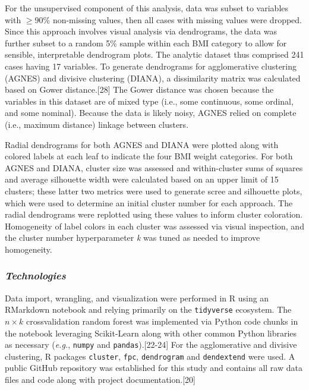 \documentclass[]{article}
\begin{document}
For the unsupervised component of this analysis, data was subset to
variables with \(\ge 90\)\% non-missing values, then all cases with
missing values were dropped. Since this approach involves visual
analysis via dendrograms, the data was further subset to a random 5\%
sample within each BMI category to allow for sensible, interpretable
dendrogram plots. The analytic dataset thus comprised 241 cases having
17 variables. To generate dendrograms for agglomerative clustering
(AGNES) and divisive clustering (DIANA), a dissimilarity matrix was
calculated based on Gower distance.{[}28{]} The Gower distance was
chosen because the variables in this dataset are of mixed type (i.e.,
some continuous, some ordinal, and some nominal). Because the data is
likely noisy, AGNES relied on complete (i.e., maximum distance) linkage
between clusters.

Radial dendrograms for both AGNES and DIANA were plotted along with
colored labels at each leaf to indicate the four BMI weight categories.
For both AGNES and DIANA, cluster size was assessed and within-cluster
sums of squares and average silhouette width were calculated based on an
upper limit of 15 clusters; these latter two metrics were used to
generate scree and silhouette plots, which were used to determine an
initial cluster number for each approach. The radial dendrograms were
replotted using these values to inform cluster coloration. Homogeneity
of label colors in each cluster was assessed via visual inspection, and
the cluster number hyperparameter \emph{k} was tuned as needed to
improve homogeneity.

\hypertarget{technologies}{%
\subsubsection{\texorpdfstring{\emph{Technologies}}{Technologies}}\label{technologies}}

Data import, wrangling, and visualization were performed in R using an
RMarkdown notebook and relying primarily on the \texttt{tidyverse}
ecosystem. The \(n \times k\) crossvalidation random forest was
implemented via Python code chunks in the notebook leveraging
Scikit-Learn along with other common Python libraries as necessary
(\emph{e.g.}, \texttt{numpy} and \texttt{pandas}).{[}22-24{]} For the
agglomerative and divisive clustering, R packages \texttt{cluster},
\texttt{fpc}, \texttt{dendrogram} and \texttt{dendextend} were used. A
public GitHub repository was established for this study and contains all
raw data files and code along with project documentation.{[}20{]}
\end{document}
